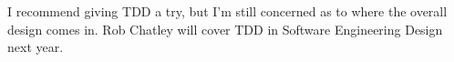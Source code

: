 \documentclass[handout]{beamer}
\begin{document}
\begin{frame}[fragile]
\begin{columns}
\begin{center}
\begin{tikzpicture}
	\end{tikzpicture}
	\end{center}

\end{columns}

    \pause
    \pause
    \pause
    \pause
    \pause
    \pause
    \vspace{10pt}
    I recommend giving TDD a try, but I'm still concerned as to where
    the overall design comes in.
    Rob Chatley will cover TDD in
    Software Engineering Design next year.

\end{frame}
\end{document}
